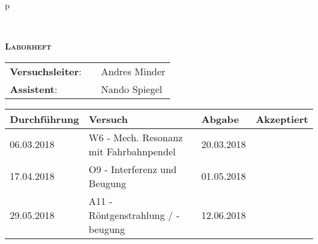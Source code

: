 \begin{tabular}{p{\textwidth}}

	\begin{center}
	\end{center}

\\

	\begin{center}
		\Huge{\textsc{\textbf{Laborheft}}}
	\end{center}

\vspace*{2cm}

	\begin{flushleft}
		\begin{tabular}{lll}
			\LARGE \textbf{Versuchsleiter}: & 	\hspace{2cm} & \LARGE Andres Minder\\
			\LARGE \textbf{Assistent}: 		& 	\hspace{2cm} & \LARGE Nando Spiegel\\
		\end{tabular}
	\end{flushleft}

\vspace*{2cm}

	\begin{center}
	\renewcommand{\arraystretch}{4}
	\large
		\begin{tabular}{|l|l|l|l|}
			\hline 
			\textbf{Durchführung} & \textbf{Versuch} & \textbf{Abgabe} & \textbf{Akzeptiert} \\ 
			\hline 
			06.03.2018 & W6 - Mech. Resonanz mit Fahrbahnpendel & 20.03.2018 &  \\ 
			\hline 
			17.04.2018 & O9 - Interferenz und Beugung 			& 01.05.2018 &  \\ 
			\hline 
			29.05.2018 & A11 - Röntgenstrahlung / -beugung 		& 12.06.2018 &  \\ 
			\hline 
		\end{tabular}
	\end{center}
		 

\end{tabular}